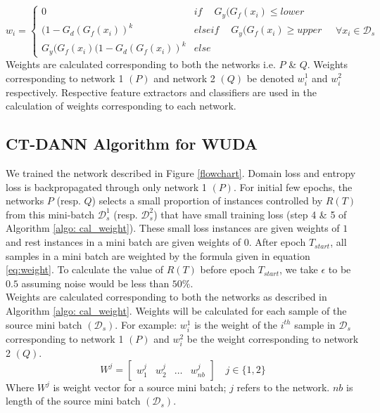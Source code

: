 \begin{equation}
\label{eq:weight}
                w_{i} = \begin{cases}
		            0 & if\ \quad G_y(G_f(x_i) \le lower \\
		            (1 - G_d(G_f(x_i))^k & elseif\ \quad G_y(G_f(x_i) \ge upper \\
		            G_y(G_f(x_i)(1 - G_d(G_f(x_i))^k & else\ 
		            \end{cases} \quad \forall x_i \in \mathcal{D}_s
\end{equation}
Weights are calculated corresponding to both the networks i.e. $P$ \& $Q$. Weights corresponding to network 1 $(P)$ and network 2 $(Q)$ be denoted $w_{i}^1$ and $w_{i}^2$ respectively. Respective feature extractors and classifiers are used in the calculation of weights corresponding to each network.  



\subsection{CT-DANN Algorithm for WUDA}
We trained the network described in Figure \ref{flowchart}. Domain loss and entropy loss is backpropagated through only network 1 $(P)$. For initial few epochs, the networks $P$ (resp. $Q$) selects a small proportion of instances controlled by $R(T)$ from this mini-batch $\mathcal{D}_{s}^1$ (resp. $\mathcal{D}_{s}^2$) that have small training loss (step 4 \& 5 of Algorithm \ref{algo: cal_weight}). These small loss instances are given weights of $1$ and rest instances in a mini batch are given weights of $0$. After epoch $T_{start}$, all samples in a mini batch are weighted by the formula given in equation \ref{eq:weight}. To calculate the value of $R(T)$ before epoch $T_{start}$, we take $\epsilon$ to be $0.5$ assuming noise would be less than $50\%$.\\
Weights are calculated corresponding to both the networks as described in Algorithm \ref{algo: cal_weight}. Weights will be calculated for each sample of the source mini batch $(\mathcal{D}_s)$. For example: $w_{i}^1$ is the weight of the $i^{th}$ sample in $\mathcal{D}_s$ corresponding to network 1 $(P)$ and $w_{i}^2$ be the weight corresponding to network 2 $(Q)$.
\begin{equation}
    W^j = \begin{bmatrix} w_{1}^j & w_{2}^j & \dots & w_{nb}^j \end{bmatrix}  \quad j \in \{1, 2\}
\end{equation}
Where $W^j$ is weight vector for a source mini batch; $j$ refers to the network. $nb$ is length of the source mini batch $(\mathcal{D}_s)$.


